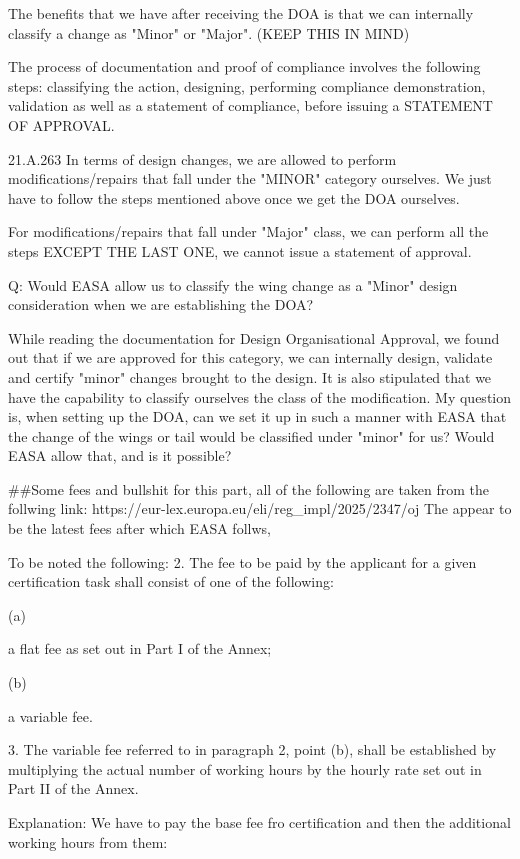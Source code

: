 The benefits that we have after receiving the DOA is that we can internally classify a change as "Minor" or "Major". (KEEP THIS IN MIND) 

The process of documentation and proof of compliance involves the following steps: classifying the action, designing, performing compliance demonstration, validation as well as a statement of compliance, before issuing a STATEMENT OF APPROVAL.

21.A.263
In terms of design changes, we are allowed to perform modifications/repairs that fall under the "MINOR" category ourselves. We just have to follow the steps mentioned above once we get the DOA ourselves.

For modifications/repairs that fall under "Major" class, we can perform all the steps EXCEPT THE LAST ONE, we cannot issue a statement of approval.


Q: Would EASA allow us to classify the wing change as a "Minor" design consideration when we are establishing the DOA?

While reading the documentation for Design Organisational Approval, we found out that if we are approved for this category, we can internally design, validate and certify "minor" changes brought to the design. It is also stipulated that we have the capability to classify ourselves the class of the modification. My question is, when setting up the DOA, can we set it up in such a manner with EASA that the change of the wings or tail would be classified under "minor" for us? Would EASA allow that, and is it possible?



##Some fees and bullshit for this part, all of the following are taken from the follwing link: https://eur-lex.europa.eu/eli/reg_impl/2025/2347/oj
The appear to be the latest fees after which EASA follws,

To be noted the following:
2.   The fee to be paid by the applicant for a given certification task shall consist of one of the following:

(a)

a flat fee as set out in Part I of the Annex;

(b)

a variable fee.

3.   The variable fee referred to in paragraph 2, point (b), shall be established by multiplying the actual number of working hours by the hourly rate set out in Part II of the Annex.

Explanation: We have to pay the base fee fro certification and then the additional working hours from them:

